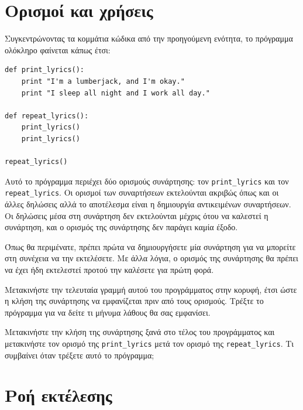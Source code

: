\documentclass[10pt]{book}
\begin{document}
\section{Ορισμοί και χρήσεις}

Συγκεντρώνοντας τα κομμάτια κώδικα από την προηγούμενη ενότητα,
το πρόγραμμα ολόκληρο φαίνεται κάπως έτσι:


\begin{verbatim}
def print_lyrics():
    print "I'm a lumberjack, and I'm okay."
    print "I sleep all night and I work all day."

def repeat_lyrics():
    print_lyrics()
    print_lyrics()

repeat_lyrics()
\end{verbatim}
%

Αυτό το πρόγραμμα περιέχει δύο ορισμούς συνάρτησης: τον \verb"print_lyrics" 
και τον \verb"repeat_lyrics". Οι ορισμοί των συναρτήσεων εκτελούνται
ακριβώς όπως και οι άλλες δηλώσεις αλλά το αποτέλεσμα είναι η δημιουργία αντικειμένων συναρτήσεων. Οι δηλώσεις μέσα στη συνάρτηση δεν εκτελούνται μέχρις ότου να καλεστεί η συνάρτηση, και ο ορισμός της συνάρτησης δεν παράγει καμία έξοδο.

Όπως θα περιμένατε, πρέπει πρώτα να δημιουργήσετε μία συνάρτηση για να μπορείτε στη συνέχεια να την εκτελέσετε. Με άλλα λόγια, ο ορισμός της συνάρτησης θα πρέπει να έχει ήδη εκτελεστεί προτού την καλέσετε για πρώτη φορά.\\


\begin{exercise}
Μετακινήστε την τελευταία γραμμή αυτού του προγράμματος στην κορυφή,
έτσι ώστε η κλήση της συνάρτησης να εμφανίζεται πριν από τους ορισμούς.
Τρέξτε το πρόγραμμα για να δείτε τι μήνυμα λάθους θα σας εμφανίσει.\\
\end{exercise}

\begin{exercise}
Μετακινήστε την κλήση της συνάρτησης ξανά στο τέλος του προγράμματος
και μετακινήστε τον ορισμό της \verb"print_lyrics" μετά τον ορισμό
της \verb"repeat_lyrics". Τι συμβαίνει όταν τρέξετε αυτό το πρόγραμμα;
\end{exercise}



\section{Ροή εκτέλεσης}
\end{document}
